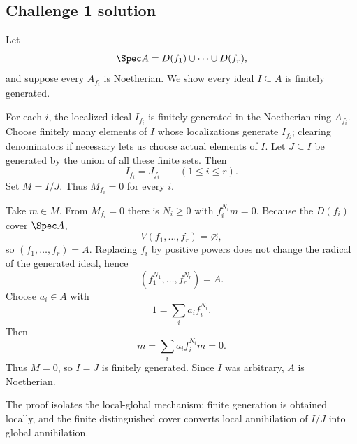 
\subsection*{Challenge 1 solution}
\begin{solution}
Let
\[
\Spec A=D(f_1)\cup\cdots\cup D(f_r),
\]
and suppose every \(A_{f_i}\) is Noetherian.  We show every ideal \(I\subseteq A\) is finitely
generated.

For each \(i\), the localized ideal \(I_{f_i}\) is finitely generated in the Noetherian ring
\(A_{f_i}\).  Choose finitely many elements of \(I\) whose localizations generate \(I_{f_i}\);
clearing denominators if necessary lets us choose actual elements of \(I\).  Let \(J\subseteq I\)
be generated by the union of all these finite sets.  Then
\[
I_{f_i}=J_{f_i}\qquad (1\le i\le r).
\]
Set \(M=I/J\).  Thus \(M_{f_i}=0\) for every \(i\).

Take \(m\in M\).  From \(M_{f_i}=0\) there is \(N_i\ge0\) with \(f_i^{N_i}m=0\).
Because the \(D(f_i)\) cover \(\Spec A\),
\[
V(f_1,\ldots,f_r)=\varnothing,
\]
so \((f_1,\ldots,f_r)=A\).  Replacing \(f_i\) by positive powers does not change the radical of the
generated ideal, hence
\[
(f_1^{N_1},\ldots,f_r^{N_r})=A.
\]
Choose \(a_i\in A\) with
\[
1=\sum_i a_i f_i^{N_i}.
\]
Then
\[
m=\sum_i a_i f_i^{N_i}m=0.
\]
Thus \(M=0\), so \(I=J\) is finitely generated.  Since \(I\) was arbitrary, \(A\) is Noetherian.

The proof isolates the local-global mechanism: finite generation is obtained locally, and the finite
distinguished cover converts local annihilation of \(I/J\) into global annihilation.
\end{solution}

